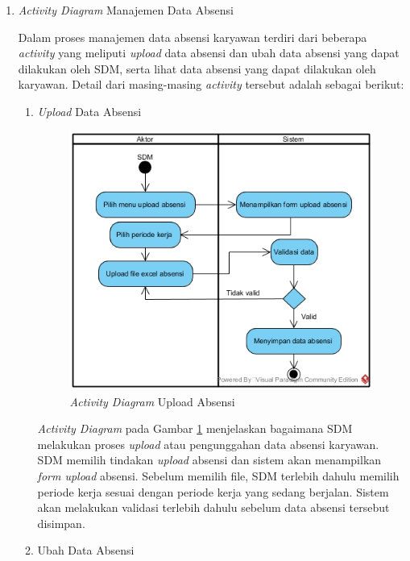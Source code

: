 \begin{enumerate}
            	\item \emph{Activity Diagram} Manajemen Data Absensi
            	
            	Dalam proses manajemen data absensi karyawan terdiri dari beberapa \emph{activity} yang meliputi \emph{upload} data absensi dan ubah data absensi yang dapat dilakukan oleh SDM, serta lihat data absensi yang dapat dilakukan oleh karyawan. Detail dari masing-masing \emph{activity} tersebut adalah sebagai berikut: \newpage
            	\begin{enumerate}[label=\alph*.]
            	    \itemsep0em
            	    \item \emph{Upload} Data Absensi
            	    \begin{figure}[H]
            		    \centering            		    \includegraphics[width=13cm]{gambar/activity/upload-absensi}
            		    \caption{\emph{Activity Diagram} Upload Absensi}
            		    \label{activity_upload_absensi}
            		\end{figure}
            		\emph{Activity Diagram} pada Gambar \ref{activity_upload_absensi} menjelaskan bagaimana SDM melakukan proses \emph{upload} atau pengunggahan data absensi karyawan. SDM memilih tindakan \emph{upload} absensi dan sistem akan menampilkan \emph{form upload} absensi. Sebelum memilih file, SDM terlebih dahulu memilih periode kerja sesuai dengan periode kerja yang sedang berjalan. Sistem akan melakukan validasi terlebih dahulu sebelum data absensi tersebut disimpan.\newpage
            	    \item Ubah Data Absensi

\end{enumerate}
\end{enumerate}
